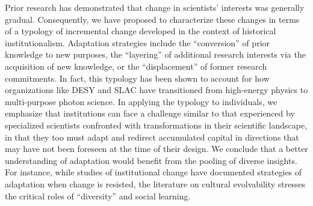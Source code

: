 \documentclass{article}
\begin{document}
Prior research has demonstrated that change in scientists' interests was generally gradual. Consequently, we have proposed to characterize these changes in terms of a typology of incremental change developed in the context of historical institutionalism. Adaptation strategies include the ``conversion'' of prior knowledge to new purposes, the ``layering'' of additional research interests via the acquisition of new knowledge, or the ``displacement'' of former research commitments. In fact, this typology has been shown to account for how organizations like DESY and SLAC have transitioned from high-energy physics to multi-purpose photon science. In applying the typology to individuals, we emphasize that institutions can face a challenge similar to that experienced by specialized scientists confronted with transformations in their scientific landscape, in that they too must adapt and redirect accumulated capital in directions that may have not been foreseen at the time of their design. We conclude that a better understanding of adaptation would benefit from the pooling of diverse insights. For instance, while  studies of institutional change have documented strategies of adaptation when change is resisted, the literature on cultural evolvability stresses the critical roles of ``diversity'' and social learning.



\end{document}
